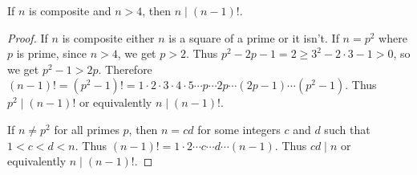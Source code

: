 \begin{lemma}
  \label{ap-n-divides-n-1-factorial}
  If \( n \) is composite and \( n > 4 \), then \( n \mid (n - 1)! \).
\end{lemma}

\begin{proof}
  If \( n \) is composite either \( n \) is a square of a prime or it
  isn't. If \( n = p^2 \) where \( p \) is prime, since \( n > 4 \),
  we get \( p > 2 \). Thus \( p^2 - 2p - 1 = 2 \ge 3^2 - 2 \cdot 3 - 1
  > 0 \), so we get \( p^2 - 1 > 2p \). Therefore \( (n - 1)! = (p^2 -
  1)! = 1 \cdot 2 \cdot 3 \cdot 4 \cdot 5 \cdots p \cdots 2p \cdots
  (2p - 1) \cdots (p^2 - 1) \). Thus \( p^2 \mid (n - 1)! \) or
  equivalently \( n \mid (n - 1)! \).

  If \( n \ne p^2 \) for all primes \( p \), then \( n = cd \) for
  some integers \( c \) and \( d \) such that \( 1 < c < d < n \).
  Thus \( (n - 1)! = 1 \cdot 2 \cdots c \cdots d \cdots (n - 1) \).
  Thus \( cd \mid n \) or equivalently \( n \mid (n - 1)! \).
\end{proof}
